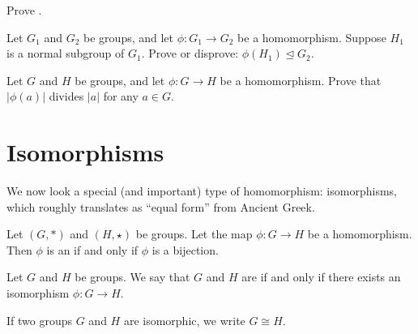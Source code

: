 \begin{exercise}\label{exercise-homomorphism-image-is-subgroup}
    Prove .
\end{exercise}
\begin{exercise}
    Let $G_1$ and $G_2$ be groups, and let $\phi: G_1 \to G_2$ be a homomorphism. Suppose $H_1$ is a normal subgroup of $G_1$. Prove or disprove: $\phi(H_1) \unlhd G_2$.
\end{exercise}
\begin{exercise}\label{exercise-order-of-homomorphism-divides-order}
    Let $G$ and $H$ be groups, and let $\phi: G \to H$ be a homomorphism. Prove that $|\phi(a)|$ divides $|a|$ for any $a \in G$.
\end{exercise}

\section{Isomorphisms}
We now look a special (and important) type of homomorphism: isomorphisms, which roughly translates as ``equal form'' from Ancient Greek.

\begin{definition}
    Let $(G, \ast)$ and $(H, \star)$ be groups. Let the map $\phi: G \to H$ be a homomorphism. Then $\phi$ is an  if and only if $\phi$ is a bijection.
\end{definition}
\begin{definition}
    Let $G$ and $H$ be groups. We say that $G$ and $H$ are  if and only if there exists an isomorphism $\phi: G \to H$.

    If two groups $G$ and $H$ are isomorphic, we write $G \cong H$.
\end{definition}

